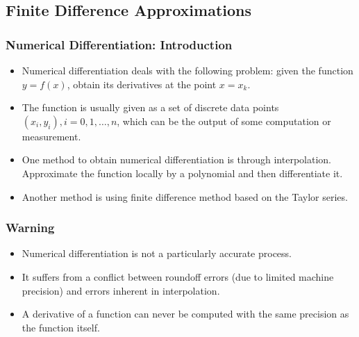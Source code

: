 \documentclass{beamer}
\begin{document}
\subsection[Finite Difference Approximations]{Finite Difference Approximations}
\begin{frame}[fragile]
\frametitle{Numerical Differentiation: Introduction}
\begin{itemize}
\item Numerical differentiation deals with the following problem: given the function $y= f(x)$, obtain its derivatives at the point $x=x_k$.
\item The function is  usually given as a set of discrete data points $(x_i, y_i), i = 0,1,\ldots, n$, which can be the output of some computation or measurement.
\item One method to obtain numerical differentiation is through \alert{interpolation}. Approximate the function locally by a \alert{polynomial} and then differentiate it.
\item Another method is using \alert{finite difference} method based on  the Taylor series. 
\end{itemize}



\end{frame}

\begin{frame}[fragile]
\frametitle{Warning}
\begin{itemize}

\item Numerical differentiation is \alert{not} a particularly accurate process.
\item It suffers from  a conflict between \alert{ roundoff errors} (due to limited machine precision) and \alert{errors inherent in interpolation}. 
\item A derivative of a function can \alert{never} be computed with the same precision as the function itself.
\end{itemize}
\end{frame}
\end{document}
